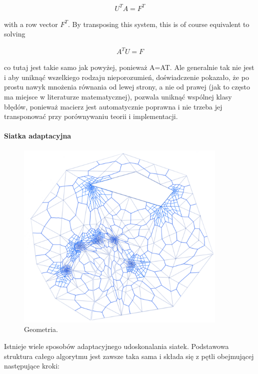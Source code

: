 \documentclass[]{pracamgr}
\begin{document}
        \begin{align*}
          U^T A = F^T
        \end{align*}

        with a row vector $F^T$. By transposing this system, this is of course equivalent to solving

        \begin{align*}
          A^T U = F
        \end{align*}

        co tutaj jest takie samo jak powyżej, ponieważ A=AT. Ale generalnie tak nie jest i aby uniknąć wszelkiego rodzaju nieporozumień, doświadczenie pokazało, że po prostu nawyk mnożenia równania od lewej strony, a nie od prawej (jak to często ma miejsce w literaturze matematycznej), pozwala uniknąć wspólnej klasy błędów, ponieważ macierz jest automatycznie poprawna i nie trzeba jej transponować przy porównywaniu teorii i implementacji.
      
      \paragraph{Siatka adaptacyjna}

        \begin{figure}[H]
          \centering
          \includegraphics[width=0.9\textwidth]{figs/adaptive_refinment.png}        
          \caption {Geometria.}
          \label{adaptive_refinment}
        \end{figure}

        Istnieje wiele sposobów adaptacyjnego udoskonalania siatek. Podstawowa struktura całego algorytmu jest zawsze taka sama i składa się z pętli obejmującej następujące kroki:
\end{document}
